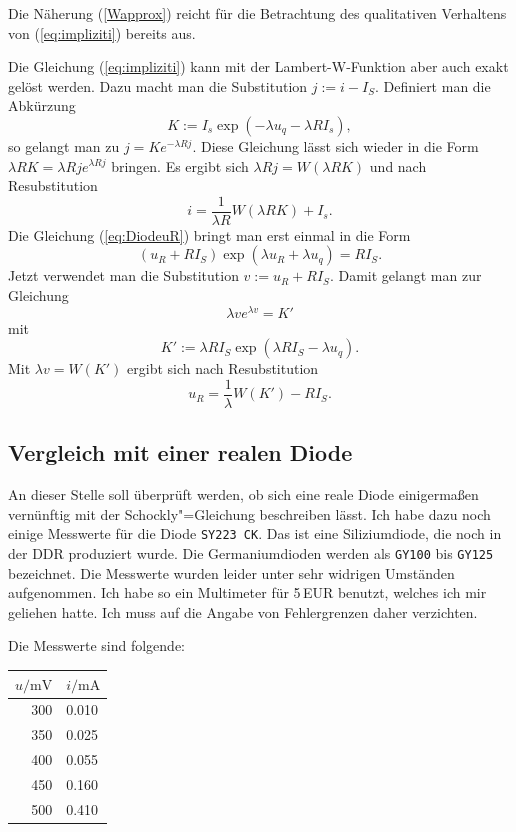 \documentclass[a4paper,10pt,fleqn,twocolumn,twoside,dvipdfmx]{scrartcl}
\numberwithin{equation}{section}
\begin{document}
Die Näherung (\ref{Wapprox}) reicht für die Betrachtung des
qualitativen Verhaltens von (\ref{eq:impliziti}) bereits aus.

Die Gleichung (\ref{eq:impliziti}) kann mit der Lambert-W-Funktion
aber auch exakt gelöst werden. Dazu macht man die Substitution
$j:=i-I_S$. Definiert man die Abkürzung%
\begin{equation}
K:=I_s\exp(-\lambda u_q-\lambda RI_s),
\end{equation}
so gelangt man zu $j=Ke^{-\lambda Rj}$. Diese Gleichung lässt sich
wieder in die Form $\lambda RK=\lambda Rje^{\lambda Rj}$
bringen. Es ergibt sich $\lambda Rj=W(\lambda RK)$ und
nach Resubstitution%
\begin{equation}
i = \frac{1}{\lambda R}W(\lambda RK)+I_s.
\end{equation}
Die Gleichung (\ref{eq:DiodeuR}) bringt man erst einmal in die
Form%
\begin{equation}
(u_R+RI_S)\exp(\lambda u_R+\lambda u_q) = RI_S.
\end{equation}
Jetzt verwendet man die Substitution
$v:=u_R+RI_S$. Damit gelangt man zur Gleichung%
\begin{equation}
\lambda ve^{\lambda v}=K'
\end{equation}
mit
\begin{equation}
K':=\lambda RI_S\exp(\lambda RI_S-\lambda u_q).
\end{equation}
Mit $\lambda v=W(K')$ ergibt sich nach Resubstitution%
\begin{equation}
u_R = \frac{1}{\lambda} W(K')-RI_S.
\end{equation}

\subsection{Vergleich mit einer realen Diode}
An dieser Stelle soll überprüft werden, ob sich eine
reale Diode einigermaßen vernünftig mit der Schockly"=Gleichung
beschreiben lässt. Ich habe dazu noch einige Messwerte für
die Diode \texttt{SY223 CK}. Das ist eine Siliziumdiode, die noch
in der DDR produziert wurde. Die Germaniumdioden werden als
\texttt{GY100} bis \texttt{GY125} bezeichnet. Die Messwerte wurden
leider unter sehr widrigen Umständen aufgenommen. Ich habe so ein
Multimeter für 5\,EUR benutzt, welches ich mir geliehen hatte.
Ich muss auf die Angabe von Fehlergrenzen daher verzichten.

Die Messwerte sind folgende:

\begin{table}[h]
{\qquad}{\normalfont\ttfamily
\begin{tabular}{@{\;}rl@{\;\,}}
\toprule
$u/\mathrm{mV}$\hspace{-4pt} & $i/\mathrm{mA}$\\
\midrule
300 & 0.010\\
350 & 0.025\\
400 & 0.055\\
450 & 0.160\\
500 & 0.410\\
\bottomrule
\end{tabular}
}
\end{table}
\end{document}
